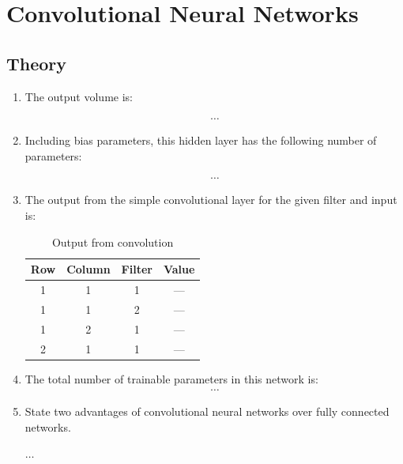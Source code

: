\section{Convolutional Neural Networks}

\subsection{Theory}

\begin{enumerate}
    \item  The output volume is:
    
    \begin{align*}
        \ldots
    \end{align*}
    \item Including bias parameters, this hidden layer has the following number of parameters:
    
    \begin{align*}
        \ldots
    \end{align*}    
    \item The output from the simple convolutional layer for the given filter and input is:
    
        \begin{table}[H]
        \centering
        \begin{tabular}{ |c|c|c|c| } 
         \hline
         \textbf{Row} &  \textbf{Column} &  \textbf{Filter} & \textbf{Value} \\
         \hline
         1 & 1 & 1 & ---\\
         1 & 1 & 2 & ---\\
         1 & 2 & 1 & ---\\
         2 & 1 & 1 & ---\\
         \hline
        \end{tabular}
        \caption{Output from convolution}
        \label{cnnValTable}
        \end{table}
    \item The total number of trainable parameters in this network is:
    \begin{align*}
        \ldots
    \end{align*}  

    \item State two advantages of convolutional neural networks over fully connected networks.
    
    $\ldots$
\end{enumerate}

